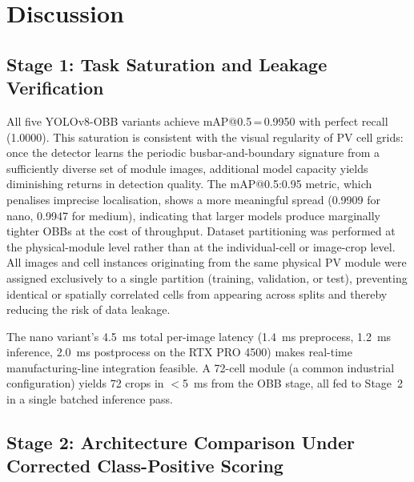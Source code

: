 \documentclass[conference]{IEEEtran}
\begin{document}
\section{Discussion}
\label{sec:discussion}

\subsection{Stage 1: Task Saturation and Leakage Verification}

All five YOLOv8-OBB variants achieve mAP@0.5\,=\,0.9950 with perfect recall (1.0000). This saturation is consistent with the visual regularity of PV cell grids: once the detector learns the periodic busbar-and-boundary signature from a sufficiently diverse set of module images, additional model capacity yields diminishing returns in detection quality. The mAP@0.5:0.95 metric, which penalises imprecise localisation, shows a more meaningful spread (0.9909 for nano, 0.9947 for medium), indicating that larger models produce marginally tighter OBBs at the cost of throughput. Dataset partitioning was performed at the physical-module level rather than at the individual-cell or image-crop level. All images and cell instances originating from the same physical PV module were assigned exclusively to a single partition (training, validation, or test), preventing identical or spatially correlated cells from appearing across splits and thereby reducing the risk of data leakage.

The nano variant's 4.5~ms total per-image latency (1.4~ms preprocess, 1.2~ms inference, 2.0~ms postprocess on the RTX PRO 4500) makes real-time manufacturing-line integration feasible. A 72-cell module (a common industrial configuration) yields 72 crops in $<$5~ms from the OBB stage, all fed to Stage~2 in a single batched inference pass.

\subsection{Stage 2: Architecture Comparison Under Corrected Class-Positive Scoring}
\end{document}
